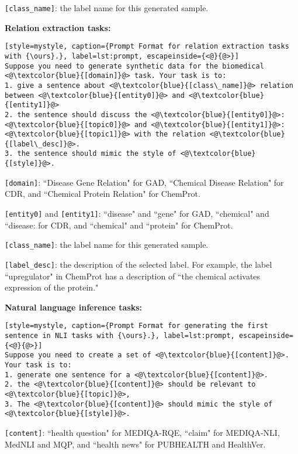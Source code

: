 \documentclass{article} %
\newcommand{\ours}{\textsc{ClinGen}\xspace}
\begin{document}
\texttt{[class\_name]}: the label name for this generated sample.

\textbf{Relation extraction tasks:}

\begin{lstlisting}[style=mystyle, caption={Prompt Format for relation extraction tasks with {\ours}.}, label=lst:prompt, escapeinside={<@}{@>}]
Suppose you need to generate synthetic data for the biomedical <@\textcolor{blue}{[domain]}@> task. Your task is to:
1. give a sentence about <@\textcolor{blue}{[class\_name]}@> relation between <@\textcolor{blue}{[entity0]}@> and <@\textcolor{blue}{[entity1]}@>
2. the sentence should discuss the <@\textcolor{blue}{[entity0]}@>: <@\textcolor{blue}{[topic0]}@> and <@\textcolor{blue}{[entity1]}@>: <@\textcolor{blue}{[topic1]}@> with the relation <@\textcolor{blue}{[label\_desc]}@>.
3. the sentence should mimic the style of <@\textcolor{blue}{[style]}@>.
\end{lstlisting}
\texttt{[domain]}: ``Disease Gene Relation" for GAD, ``Chemical Disease Relation" for CDR, and ``Chemical Protein Relation" for ChemProt.

\texttt{[entity0]} and \texttt{[entity1]}: ``disease" and ``gene" for GAD, ``chemical" and ``disease: for CDR, and ``chemical" and ``protein" for ChemProt.

\texttt{[class\_name]}: the label name for this generated sample.

\texttt{[label\_desc]}: the description of the selected label. For example, the label ``upregulator" in ChemProt has a description of ``the chemical activates expression of the protein."

\textbf{Natural language inference tasks:}
\begin{lstlisting}[style=mystyle, caption={Prompt Format for generating the first sentence in NLI tasks with {\ours}.}, label=lst:prompt, escapeinside={<@}{@>}]
Suppose you need to create a set of <@\textcolor{blue}{[content]}@>. Your task is to:
1. generate one sentence for a <@\textcolor{blue}{[content]}@>.
2. the <@\textcolor{blue}{[content]}@> should be relevant to <@\textcolor{blue}{[topic]}@>,
3. The <@\textcolor{blue}{[content]}@> should mimic the style of <@\textcolor{blue}{[style]}@>.
\end{lstlisting}
\texttt{[content]}: ``health question" for MEDIQA-RQE, ``claim" for MEDIQA-NLI, MedNLI and MQP, and ``health news" for PUBHEALTH and HealthVer.
\end{document}

